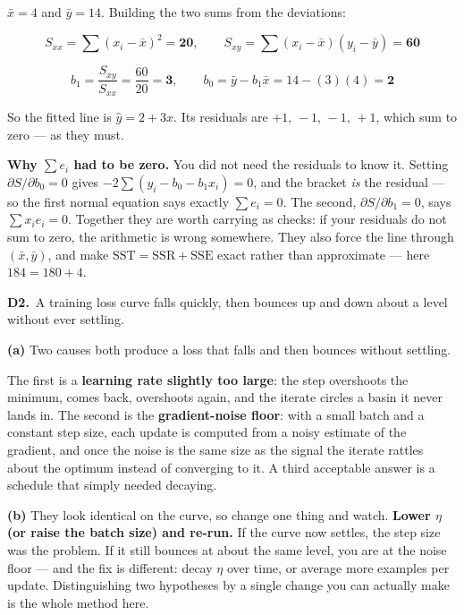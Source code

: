 \documentclass[10pt,a4paper]{article}
\newcommand{\sol}[1]{\textbf{#1}}
\begin{document}
\vspace{2pt}

$\bar x = 4$ and $\bar y = 14$. Building the two sums from the deviations:

\[ S_{xx} = \sum (x_i-\bar x)^2 = \sol{20}, \qquad S_{xy} = \sum (x_i-\bar x)(y_i-\bar y) = \sol{60} \]

\[ b_1 = \frac{S_{xy}}{S_{xx}} = \frac{60}{20} = \sol{3}, \qquad b_0 = \bar y - b_1\bar x = 14 - (3)(4) = \sol{2} \]

So the fitted line is $\hat y = 2 + 3 x$. Its residuals are $+1,\,-1,\,-1,\,+1$, which sum to zero --- as they must.

\vspace{2pt}

\textbf{Why $\sum e_i$ had to be zero.} You did not need the residuals to know it. Setting $\partial S/\partial b_0 = 0$ gives $-2\sum(y_i - b_0 - b_1x_i) = 0$, and the bracket \emph{is} the residual --- so the first normal equation says exactly $\sum e_i = 0$. The second, $\partial S/\partial b_1 = 0$, says $\sum x_ie_i = 0$. Together they are worth carrying as checks: if your residuals do not sum to zero, the arithmetic is wrong somewhere. They also force the line through $(\bar x, \bar y)$, and make $\mathrm{SST} = \mathrm{SSR} + \mathrm{SSE}$ exact rather than approximate --- here $184 = 180 + 4$.

\vspace{6pt}

\textbf{D2.}\ A training loss curve falls quickly, then bounces up and down about a level without ever settling.

\vspace{2pt}

\textbf{(a)} Two causes both produce a loss that falls and then bounces without settling.\par\vspace{1mm}The first is a \textbf{learning rate slightly too large}: the step overshoots the minimum, comes back, overshoots again, and the iterate circles a basin it never lands in. The second is the \textbf{gradient-noise floor}: with a small batch and a constant step size, each update is computed from a noisy estimate of the gradient, and once the noise is the same size as the signal the iterate rattles about the optimum instead of converging to it. A third acceptable answer is a schedule that simply needed decaying.\par\vspace{1mm}\textbf{(b)} They look identical on the curve, so change one thing and watch. \textbf{Lower $\eta$ (or raise the batch size) and re-run.} If the curve now settles, the step size was the problem. If it still bounces at about the same level, you are at the noise floor --- and the fix is different: decay $\eta$ over time, or average more examples per update. Distinguishing two hypotheses by a single change you can actually make is the whole method here.
\end{document}
